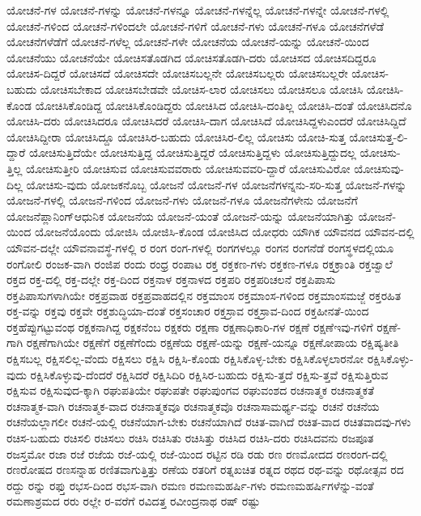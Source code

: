 {ಯೋಚನೆ-ಗಳ
ಯೋಚನೆ-ಗಳನ್ನು
ಯೋಚನೆ-ಗಳನ್ನೂ
ಯೋಚನೆ-ಗಳನ್ನೆಲ್ಲ
ಯೋಚನೆ-ಗಳನ್ನೇ
ಯೋಚನೆ-ಗಳಲ್ಲಿ
ಯೋಚನೆ-ಗಳಿಂದ
ಯೋಚನೆ-ಗಳಿಂದಲೇ
ಯೋಚನೆ-ಗಳಿಗೆ
ಯೋಚನೆ-ಗಳು
ಯೋಚನೆ-ಗಳೂ
ಯೋಚನೆಗಳೆಡೆ
ಯೋಚನೆಗಳೆಡೆಗೆ
ಯೋಚನೆ-ಗಳೆಲ್ಲ
ಯೋಚನೆ-ಗಳೇ
ಯೋಚನೆಯ
ಯೋಚನೆ-ಯನ್ನು
ಯೋಚನೆ-ಯಿಂದ
ಯೋಚನೆಯು
ಯೋಚನೆಯೇ
ಯೋಚಿಸತೊಡಗಿದ
ಯೋಚಿಸತೊಡಗಿ-ದರು
ಯೋಚಿಸದ
ಯೋಚಿಸದಿದ್ದರೂ
ಯೋಚಿಸ-ದಿದ್ದರೆ
ಯೋಚಿಸದೆ
ಯೋಚಿಸದೇ
ಯೋಚಿಸಬಲ್ಲನೇ
ಯೋಚಿಸಬಲ್ಲರು
ಯೋಚಿಸಬಲ್ಲರೇ
ಯೋಚಿಸ-ಬಹುದು
ಯೋಚಿಸಬೇಕಾದ
ಯೋಚಿಸಬೇಡವೇ
ಯೋಚಿಸ-ಲಾರ
ಯೋಚಿಸಲು
ಯೋಚಿಸಲೂ
ಯೋಚಿಸಿ
ಯೋಚಿಸಿ-ಕೊಂಡ
ಯೋಚಿಸಿಕೊಂಡಿದ್ದ
ಯೋಚಿಸಿಕೊಂಡಿದ್ದರು
ಯೋಚಿಸಿದ
ಯೋಚಿಸಿ-ದಂತಿಲ್ಲ
ಯೋಚಿಸಿ-ದಂತೆ
ಯೋಚಿಸಿದನೊ
ಯೋಚಿಸಿ-ದರು
ಯೋಚಿಸಿದರೂ
ಯೋಚಿಸಿದರೆ
ಯೋಚಿಸಿ-ದಾಗ
ಯೋಚಿಸಿದೆ
ಯೋಚಿಸಿದ್ದಳುಎಂದರೆ
ಯೋಚಿಸಿದ್ದಿದೆ
ಯೋಚಿಸಿದ್ದೀರಾ
ಯೋಚಿಸಿದ್ದೂ
ಯೋಚಿಸಿರ-ಬಹುದು
ಯೋಚಿಸಿರ-ಲಿಲ್ಲ
ಯೋಚಿಸು
ಯೋಚಿ-ಸುತ್ತ
ಯೋಚಿಸುತ್ತ-ಲಿ-ದ್ದಾರೆ
ಯೋಚಿಸುತ್ತಿದೆಯೇ
ಯೋಚಿಸುತ್ತಿದ್ದ
ಯೋಚಿಸುತ್ತಿದ್ದರೆ
ಯೋಚಿಸುತ್ತಿದ್ದಳು
ಯೋಚಿಸುತ್ತಿದ್ದುದಲ್ಲ
ಯೋಚಿಸು-ತ್ತಿಲ್ಲ
ಯೋಚಿಸುತ್ತೀರಿ
ಯೋಚಿಸುವ
ಯೋಚಿಸುವವರಾರು
ಯೋಚಿಸುವವರಿ-ದ್ದಾರೆ
ಯೋಚಿಸುವಿರೋ
ಯೋಚಿಸುವು-ದಿಲ್ಲ
ಯೋಚಿಸು-ವುದು
ಯೋಜಕನೊಬ್ಬ
ಯೋಜನೆ
ಯೋಜನೆ-ಗಳ
ಯೋಜನೆಗಳನ್ನನು-ಸರಿ-ಸುತ್ತ
ಯೋಜನೆ-ಗಳನ್ನು
ಯೋಜನೆ-ಗಳಲ್ಲಿ
ಯೋಜನೆ-ಗಳಿಂದ
ಯೋಜನೆ-ಗಳು
ಯೋಜನೆ-ಗಳೂ
ಯೋಜನೆಗಳೇನು
ಯೋಜನೆಗೆ
ಯೋಜನೆಪ್ಲಾನಿಂಗ್ಆಧುನಿಕ
ಯೋಜನೆಯ
ಯೋಜನೆ-ಯಂತೆ
ಯೋಜನೆ-ಯನ್ನು
ಯೋಜನೆಯಾಗಿತ್ತು
ಯೋಜನೆ-ಯಿಂದ
ಯೋಜನೆಯೊಂದು
ಯೋಜಿಸಿ
ಯೋಜಿಸಿ-ಕೊಂಡ
ಯೋಜಿಸಿದ
ಯೋಧರು
ಯೌಗಿಕ
ಯೌವನದ
ಯೌವನ-ದಲ್ಲಿ
ಯೌವನ-ದಲ್ಲೇ
ಯೌವನಾವಸ್ಥೆ-ಗಳಲ್ಲಿ
ರ
ರಂಗ
ರಂಗ-ಗಳಲ್ಲಿ
ರಂಗಗಳಲ್ಲೂ
ರಂಗನ
ರಂಗನೆಡೆ
ರಂಗಸ್ಥಳದಲ್ಲಿಯೂ
ರಂಗೋಲಿ
ರಂಜಕ-ವಾಗಿ
ರಂಜಿಪ
ರಂದು
ರಂಧ್ರ
ರಂಪಾಟ
ರಕ್ತ
ರಕ್ತಕಣ-ಗಳು
ರಕ್ತಕಣ-ಗಳೂ
ರಕ್ತಕ್ರಾಂತಿ
ರಕ್ತಜ್ವಾಲೆ
ರಕ್ತದ
ರಕ್ತ-ದಲ್ಲಿ
ರಕ್ತ-ದಲ್ಲೇ
ರಕ್ತ-ದಿಂದ
ರಕ್ತನಾಳ
ರಕ್ತನಾಳದ
ರಕ್ತಪರಿ
ರಕ್ತಪರಿಚಲನೆ
ರಕ್ತಪಿಪಾಸು
ರಕ್ತಪಿಪಾಸುಗಳಾಗಿಯೇ
ರಕ್ತಪ್ರವಾಹ
ರಕ್ತಪ್ರವಾಹದಲ್ಲಿನ
ರಕ್ತಮಾಂಸ
ರಕ್ತಮಾಂಸ-ಗಳಿಂದ
ರಕ್ತಮಾಂಸಮಜ್ಜೆ
ರಕ್ತರಹಿತ
ರಕ್ತ-ವನ್ನು
ರಕ್ತವು
ರಕ್ತವೇ
ರಕ್ತಶುದ್ಧಿಯಾ-ದಂತೆ
ರಕ್ತಸಂಚಾರ
ರಕ್ತಸ್ರಾವ
ರಕ್ತಸ್ರಾವ-ದಿಂದ
ರಕ್ತಹೀನತೆ-ಯಿಂದ
ರಕ್ತಹೆಪ್ಪುಗಟ್ಟುವಂಥ
ರಕ್ಷಕನಾಗಿದ್ದ
ರಕ್ಷಕನೆಂಬ
ರಕ್ಷಕರು
ರಕ್ಷಣಾ
ರಕ್ಷಣಾಧಿಕಾರಿ-ಗಳ
ರಕ್ಷಣೆ
ರಕ್ಷಣೆಇವು-ಗಳಿಗೆ
ರಕ್ಷಣೆ-ಗಾಗಿ
ರಕ್ಷಣೆಗಾಗಿಯೇ
ರಕ್ಷಣೆಗೆ
ರಕ್ಷಣೆಗೆಂದು
ರಕ್ಷಣೆಯ
ರಕ್ಷಣೆ-ಯನ್ನು
ರಕ್ಷಣೆ-ಯನ್ನೂ
ರಕ್ಷಣೋಪಾಯ
ರಕ್ಷಿಷ್ಯತೀತಿ
ರಕ್ಷಿಸಬಲ್ಲ
ರಕ್ಷಿಸಲಿಲ್ಲ-ವೆಂದು
ರಕ್ಷಿಸಲು
ರಕ್ಷಿಸಿ
ರಕ್ಷಿಸಿ-ಕೊಂಡು
ರಕ್ಷಿಸಿಕೊಳ್ಳ-ಬೇಕು
ರಕ್ಷಿಸಿಕೊಳ್ಳಲಾರನೋ
ರಕ್ಷಿಸಿಕೊಳ್ಳು-ವುದು
ರಕ್ಷಿಸಿಕೊಳ್ಳುವು-ದೆಂದರೆ
ರಕ್ಷಿಸಿದರೆ
ರಕ್ಷಿಸಿದಿರಿ
ರಕ್ಷಿಸಿರ-ಬಹುದು
ರಕ್ಷಿಸು-ತ್ತದೆ
ರಕ್ಷಿಸು-ತ್ತವೆ
ರಕ್ಷಿಸುತ್ತಿರುವ
ರಕ್ಷಿಸುವ
ರಕ್ಷಿಸುವುದ-ಕ್ಕಾಗಿ
ರಘುಪತಿಯೇ
ರಘುಪತೇ
ರಘುಪುಂಗವ
ರಘುವಂಶದ
ರಚನಾತ್ಮಕ
ರಚನಾತ್ಮಕತೆ
ರಚನಾತ್ಮಕ-ವಾಗಿ
ರಚನಾತ್ಮಕ-ವಾದ
ರಚನಾತ್ಮಕವೂ
ರಚನಾತ್ಮಕವೊ
ರಚನಾಸಾಮರ್ಥ್ಯ-ವನ್ನು
ರಚನೆ
ರಚನೆಯ
ರಚನೆಯಲ್ಲಾಗಲೀ
ರಚನೆ-ಯಲ್ಲಿ
ರಚನೆಯಾಗ-ಬೇಕು
ರಚನೆಯಾಗಿದೆ
ರಚಿತ-ವಾಗಿದೆ
ರಚಿತ-ವಾದ
ರಚಿತವಾದವು-ಗಳು
ರಚಿಸ-ಬಹುದು
ರಚಿಸಲಿ
ರಚಿಸಲು
ರಚಿಸಿ
ರಚಿಸಿತು
ರಚಿಸಿತ್ತು
ರಚಿಸಿದ
ರಚಿಸಿ-ದರು
ರಚಿಸಿದವನು
ರಜಪೂತ
ರಜಸ್ತಮೋ
ರಜಾ
ರಜೆ
ರಜೆಯ
ರಜೆ-ಯಲ್ಲಿ
ರಜೆ-ಯಿಂದ
ರಟ್ಟಿನ
ರಡಿ
ರಡು
ರಣ
ರಣಮೋದದ
ರಣರಂಗ-ದಲ್ಲಿ
ರಣರೋಷದ
ರಣಸನ್ನಾಹ
ರಣಿತವಾಗುತ್ತಿತ್ತು
ರಣೆಯ
ರತರಿಗೆ
ರತ್ನಖಚಿತ
ರತ್ನದ
ರಥದ
ರಥ-ವನ್ನು
ರಥೋತ್ಸವ
ರದ
ರದ್ದು
ರನ್ನು
ರಫ್ತು
ರಭಸ-ದಿಂದ
ರಭಸ-ವಾಗಿ
ರಮಣ
ರಮಣಮಹರ್ಷಿ-ಗಳು
ರಮಣಮಹರ್ಷಿಗಳೆನ್ನು-ವಂತೆ
ರಮಣಾಶ್ರಮದ
ರರು
ರಲ್ಲೇ
ರ-ವರೆಗೆ
ರವಿದತ್ತ
ರವೀಂದ್ರನಾಥ
ರಷ್
ರಷ್ಟು
}
